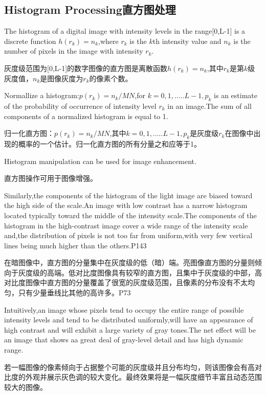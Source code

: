 \documentclass[12pt]{article}
\numberwithin{equation}{section}%
\begin{document}
\subsection{Histogram Processing直方图处理}

The histogram of a digital image with intensity levels in the range[0,L-1] is a discrete function $h(r_{k})=n_{k}$,where $r_{k}$ is the $k$th intensity value and $n_{k}$ is the number of pixels in the image with intensity $r_{k}$.

灰度级范围为[0,L-1]的数字图像的直方图是离散函数$h(r_{k})=n_{k}$,其中$r_{k}$是第$k$级灰度值，$n_{k}$是图像灰度为$r_{k}$的像素个数。

Normallize a histogram:$p(r_{k})=n_{k}/MN$,for $k=0,1,.....L-1,p_{k}$ is an estimate of the probability of occurrence of intensity level $r_{k}$ in an image.The sum of all components of a normalized histogram is equal to 1.

归一化直方图：$p(r_{k})=n_{k}/MN$,其中$k=0,1,.....L-1,p_{k}$是灰度级$r_{k}$在图像中出现的概率的一个估计。归一化直方图的所有分量之和应等于1。

Histogram manipulation can be used for image enhancement.

直方图操作可用于图像增强。

Similarly,the components of the histogram of the light image are biased toward the high side of the scale.An image with low contrast has a narrow histogram located typically toward the middle of the intensity scale.The components of the histogram in the high-contrast image cover a wide range of the intensity scale and,the distribution of pixels is not too far from uniform,with very few vertical lines being much higher than the others.P143

在暗图像中，直方图的分量集中在灰度级的低（暗）端。亮图像直方图的分量则倾向于灰度级的高端。低对比度图像具有较窄的直方图，且集中于灰度级的中部，高对比度图像中直方图的分量覆盖了很宽的灰度级范围，且像素的分布没有不太均匀，只有少量垂线比其他的高许多。P73

Intuitively,an image whose pixels tend to occupy the entire range of possible intensity levels and tend to be distributed uniformly,will have an appearance of high contrast and will exhibit a large variety of gray tones.The net effect will be an image that shows aa great deal of gray-level detail and has high dynamic range. 

若一幅图像的像素倾向于占据整个可能的灰度级并且分布均匀，则该图像会有高对比度的外观并展示灰色调的较大变化。最终效果将是一幅灰度细节丰富且动态范围较大的图像。
\end{document}
